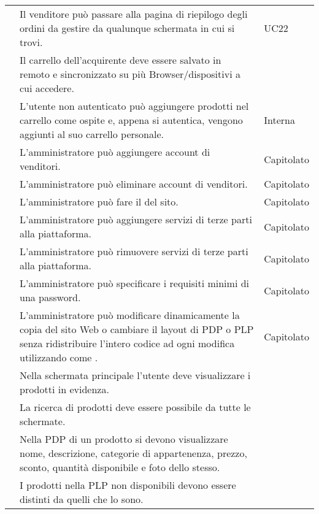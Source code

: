 \begin{longtable}{|c C{9.5cm} C{2.5cm}|}
     & Il venditore può passare alla pagina di riepilogo degli ordini da gestire da qualunque schermata in cui si trovi. & UC22 \\
    
     & Il carrello dell'acquirente deve essere salvato in remoto e sincronizzato su più Browser/dispositivi a cui accedere. &  \\
    
     & L'utente non autenticato può aggiungere prodotti nel carrello come ospite e, appena si autentica, vengono aggiunti al suo carrello personale. & Interna \\
    
     & L'amministratore può aggiungere account di venditori. & Capitolato \\
    
     & L'amministratore può eliminare account di venditori. & Capitolato \\
        
     & L'amministratore può fare il  del sito. & Capitolato \\
    
     & L'amministratore può aggiungere servizi di terze parti alla piattaforma. & Capitolato \\
    
     & L'amministratore può rimuovere servizi di terze parti alla piattaforma. & Capitolato \\
    
     & L'amministratore può specificare i requisiti minimi di una password. & Capitolato \\
    
     & L'amministratore può modificare dinamicamente la copia del sito Web o cambiare il layout di PDP o PLP senza ridistribuire l'intero codice ad ogni modifica utilizzando  come . & Capitolato \\

     & Nella schermata principale l'utente deve visualizzare i prodotti in evidenza. &  \\
    
     & La ricerca di prodotti deve essere possibile da tutte le schermate. &  \\
    
     & Nella PDP di un prodotto si devono visualizzare nome, descrizione, categorie di appartenenza, prezzo, sconto, quantità disponibile e foto dello stesso. & \\
    
      & I prodotti nella PLP non disponibili devono essere distinti da quelli che lo sono. & \\
     

\end{longtable}
